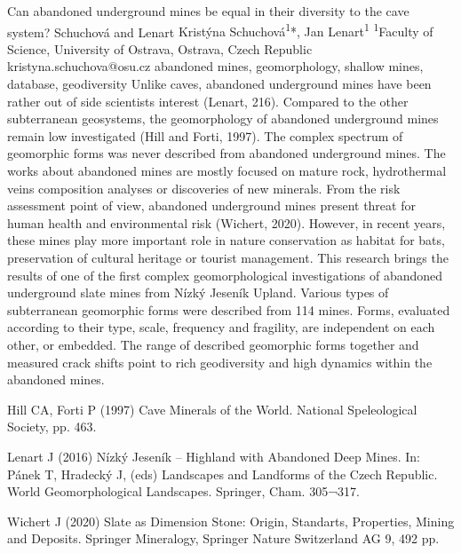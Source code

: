 \abstract
{Can abandoned underground mines be equal in their diversity to the cave system?} 
{Schuchová and Lenart} 
{Kristýna Schuchová\textsuperscript{1}*, Jan Lenart\textsuperscript{1}} 
{\TLtag} 
{
	\textsuperscript{1}Faculty of Science, University of Ostrava, Ostrava, Czech Republic
}
{kristyna.schuchova@osu.cz}  %
{abandoned mines, geomorphology, shallow mines, database, geodiversity}
{Unlike caves, abandoned underground mines have been rather out of side scientists interest (Lenart, 216). Compared to the other subterranean geosystems, the geomorphology of abandoned underground mines remain low investigated (Hill and Forti, 1997). The complex spectrum of geomorphic forms was never described from abandoned underground mines. The works about abandoned mines are mostly focused on mature rock, hydrothermal veins composition analyses or discoveries of new minerals. From the risk assessment point of view, abandoned underground mines present threat for human health and environmental risk (Wichert, 2020). However, in recent years, these mines play more important role in nature conservation as habitat for bats, preservation of cultural heritage or tourist management. This research brings the results of one of the first complex geomorphological investigations of abandoned underground slate mines from Nízký Jeseník Upland. Various types of subterranean geomorphic forms were described from 114 mines. Forms, evaluated according to their type, scale, frequency and fragility, are independent on each other, or embedded. The range of described geomorphic forms together and measured crack shifts point to rich geodiversity and high dynamics within the abandoned mines.
}
{Hill CA, Forti P (1997) Cave Minerals of the World. National Speleological Society, pp. 463. 

Lenart J (2016) Nízký Jeseník – Highland with Abandoned Deep Mines. In: Pánek T, Hradecký J, (eds) Landscapes and Landforms of the Czech Republic. World Geomorphological Landscapes. Springer, Cham. 305¬317. 

Wichert J (2020) Slate as Dimension Stone: Origin, Standarts, Properties, Mining and Deposits. Springer Mineralogy, Springer Nature Switzerland AG 9, 492 pp. 
}
